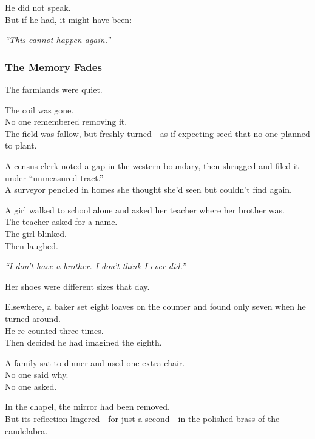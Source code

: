 \documentclass[12pt]{article}
\begin{document}
\vspace{0.5em}
He did not speak.\\
But if he had, it might have been:

\vspace{0.5em}
\textit{``This cannot happen again.''}


\dotfill

\subsubsection*{The Memory Fades}

The farmlands were quiet.

\vspace{0.5em}
The coil was gone.\\
No one remembered removing it.\\
The field was fallow, but freshly turned---as if expecting seed that no one planned to plant.

\vspace{0.5em}
A census clerk noted a gap in the western boundary, then shrugged and filed it under ``unmeasured tract.''\\
A surveyor penciled in homes she thought she’d seen but couldn’t find again.

\vspace{0.5em}
A girl walked to school alone and asked her teacher where her brother was.\\
The teacher asked for a name.\\
The girl blinked.\\
Then laughed.

\vspace{0.5em}
\textit{``I don’t have a brother. I don’t think I ever did.''}

\vspace{0.5em}
Her shoes were different sizes that day.

\vspace{0.5em}
Elsewhere, a baker set eight loaves on the counter and found only seven when he turned around.\\
He re-counted three times.\\
Then decided he had imagined the eighth.

\vspace{0.5em}
A family sat to dinner and used one extra chair.\\
No one said why.\\
No one asked.

\vspace{0.5em}
In the chapel, the mirror had been removed.\\
But its reflection lingered---for just a second---in the polished brass of the candelabra.
\end{document}
